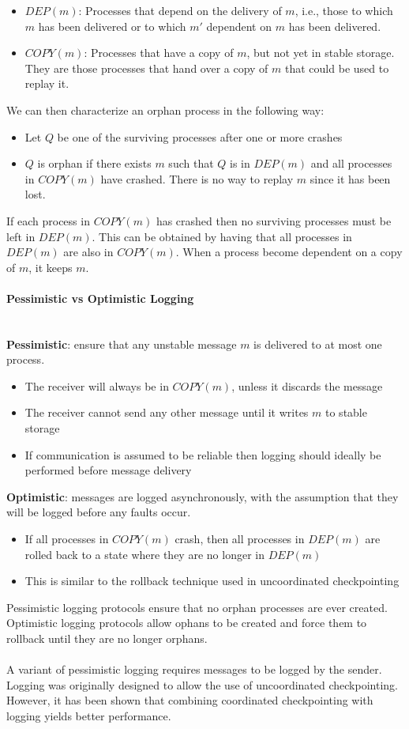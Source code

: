 \documentclass[10pt,a4paper]{article}
\newcommand{\myparagraph}[1]{\paragraph{#1}\mbox{}\\[0.05in]}
\begin{document}
\begin{itemize}
	\item $DEP(m)$: Processes that depend on the delivery of $m$, i.e., those to which $m$ has been delivered or to which $m'$ dependent on $m$ has been delivered.
	\item $COPY(m)$: Processes that have a copy of $m$, but not yet in stable storage. They are those processes that hand over a copy of $m$ that could be used to replay it.
\end{itemize} \pagebreak
We can then characterize an orphan process in the following way:
\begin{itemize}
	\item Let $Q$ be one of the surviving processes after one or more crashes
	\item $Q$ is orphan if there exists $m$ such that $Q$ is in $DEP(m)$ and all processes in $COPY(m)$ have crashed. There is no way to replay $m$ since it has been lost.
\end{itemize}
If each process in $COPY(m)$ has crashed then no surviving processes must be left in $DEP(m)$. This can be obtained by having that all processes in $DEP(m)$ are also in $COPY(m)$. When a process become dependent on a copy of $m$, it keeps $m$.
\myparagraph{Pessimistic vs Optimistic Logging}
\textbf{Pessimistic}: ensure that any unstable message $m$ is delivered to at most one process.
\begin{itemize}
	\item The receiver will always be in $COPY(m)$, unless it discards the message
	\item The receiver cannot send any other message until it writes $m$ to stable storage
	\item If communication is assumed to be reliable then logging should ideally be performed before message delivery
\end{itemize}
\textbf{Optimistic}: messages are logged asynchronously, with the assumption that they will be logged before any faults occur.
\begin{itemize}
	\item If all processes in $COPY(m)$ crash, then all processes in $DEP(m)$ are rolled back to a state where they are no longer in $DEP(m)$
	\item This is similar to the rollback technique used in uncoordinated checkpointing
\end{itemize}
Pessimistic logging protocols ensure that no orphan processes are ever created. \\ Optimistic logging protocols allow ophans to be created and force them to rollback until they are no longer orphans. \\ \\
A variant of pessimistic logging requires messages to be logged by the sender. \\ Logging was originally designed to allow the use of uncoordinated checkpointing. However, it has been shown that combining coordinated checkpointing with logging yields better performance.
\pagebreak
\end{document}
